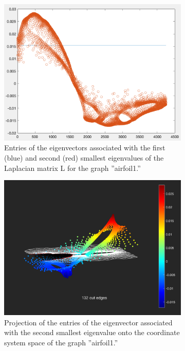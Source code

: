 \documentclass[unicode,11pt,a4paper,oneside,numbers=endperiod,openany]{scrartcl}
\begin{document}
\begin{figure}[H]
        \centering
        \begin{subfigure}[b]{0.475\textwidth}
            \centering
            \includegraphics[width=\textwidth]{1.png}
            {{\small Entries of the eigenvectors associated with the first (blue) and second (red) smallest eigenvalues of the Laplacian matrix L for the graph ”airfoil1.”}}    
        \end{subfigure}
        \hfill
        \begin{subfigure}[b]{0.475\textwidth}  
            \centering 
            \includegraphics[width=\textwidth]{2.png}
            {{\small Projection of the entries of the eigenvector associated with the second smallest eigenvalue onto the coordinate system space of the graph ”airfoil1.”}}    

\end{subfigure}
\end{figure}
\end{document}
